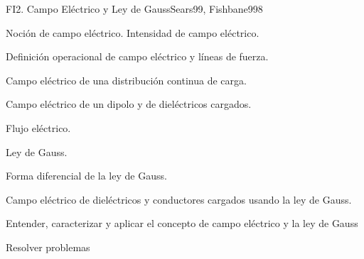 \begin{syllabus}
\begin{unit}{FI2. Campo Eléctrico y Ley de Gauss}{Sears99, Fishbane99}{8}
   \begin{topics}
         \item  Noción de campo eléctrico.  Intensidad de campo eléctrico.
	 \item  Definición operacional de campo eléctrico y líneas de fuerza.
         \item  Campo eléctrico de una distribución continua de carga.
	 \item  Campo eléctrico de un dipolo y de dieléctricos cargados.
         \item  Flujo eléctrico.
	 \item  Ley de Gauss.
         \item  Forma diferencial de la ley de Gauss.
	 \item  Campo eléctrico de dieléctricos y conductores cargados usando la ley de Gauss.
   \end{topics}

   \begin{unitgoals}
         \item  Entender, caracterizar y aplicar el concepto de campo eléctrico y la ley de Gauss
         \item  Resolver problemas
   \end{unitgoals}
\end{unit}


\end{syllabus}
